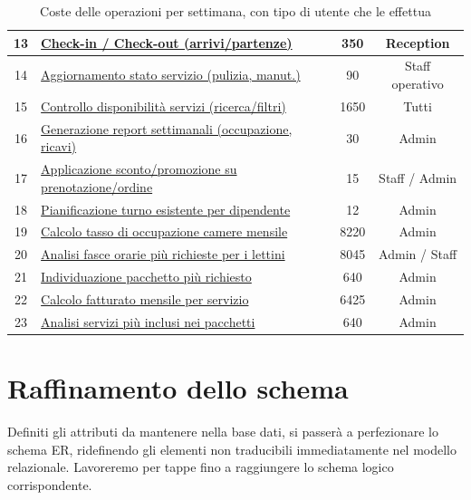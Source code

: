 \documentclass[a4paper,12pt]{report}
\begin{document}
\begin{table}[H]
\begin{tabularx}{\textwidth}{|c|>{\raggedright\arraybackslash}X|c|c|}
		\hline
		13          & \hyperref[op13]{Check-in / Check-out (arrivi/partenze)}                & 350                       & Reception              \\
		\hline
		14          & \hyperref[op14]{Aggiornamento stato servizio (pulizia, manut.)}        & 90                        & Staff operativo        \\
		\hline
		15          & \hyperref[op15]{Controllo disponibilità servizi (ricerca/filtri)}      & 1650                      & Tutti                  \\
		\hline
		16          & \hyperref[op16]{Generazione report settimanali (occupazione, ricavi)}  & 30                        & Admin                  \\
		\hline
		17          & \hyperref[op17]{Applicazione sconto/promozione su prenotazione/ordine} & 15                        & Staff / Admin          \\
		\hline
		18          & \hyperref[op18]{Pianificazione turno esistente per dipendente}  & 12                         & Admin                  \\
		\hline
		19          & \hyperref[op19]{Calcolo tasso di occupazione camere mensile}           & 8220                      & Admin                  \\
		\hline
		20          & \hyperref[op20]{Analisi fasce orarie più richieste per i lettini}      & 8045                      & Admin / Staff          \\
		\hline
		21          & \hyperref[op21]{Individuazione pacchetto più richiesto}                & 640                       & Admin                  \\
		\hline
		22          & \hyperref[op22]{Calcolo fatturato mensile per servizio}                & 6425                     & Admin                  \\
		\hline
		23          & \hyperref[op23]{Analisi servizi più inclusi nei pacchetti}             & 640                       & Admin                  \\
		\hline
	\end{tabularx}
	\caption{Coste delle operazioni per settimana, con tipo di utente che le effettua}
	\label{tab:costo-operazioni-settimanali}
\end{table}


\newpage
\section{Raffinamento dello schema}
Definiti gli attributi da mantenere nella base dati, si passerà a perfezionare lo schema ER, ridefinendo gli elementi non
traducibili immediatamente nel modello relazionale. Lavoreremo per tappe fino a raggiungere lo schema logico corrispondente.
\end{document}
